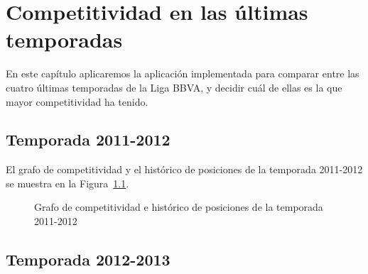 \chapter{Competitividad en las últimas temporadas}

En este capítulo aplicaremos la aplicación implementada para comparar entre las cuatro últimas temporadas de la Liga BBVA, y decidir cuál de ellas es la que mayor competitividad ha tenido.\\

\section{Temporada 2011-2012}

El grafo de competitividad y el histórico de posiciones de la temporada 2011-2012 se muestra en la Figura~\ref{fig:grafo-2011-2012}.


\begin{figure}[htbp]
\centering
{}
\caption[Competitividad de la temporada 2011-2012]{Grafo de competitividad e histórico de posiciones de la temporada 2011-2012} \label{fig:grafo-2011-2012}
\end{figure}

\clearpage

\section{Temporada 2012-2013}

